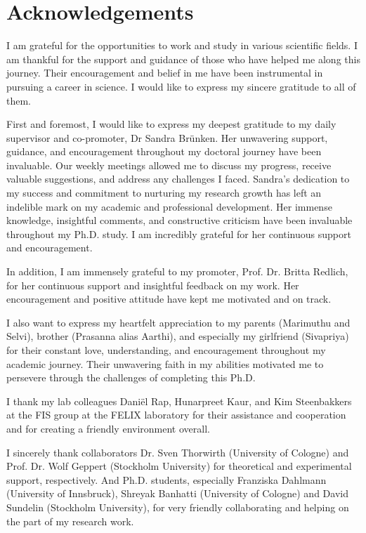 \chapter{Acknowledgements}
\label{acknowledgements}

I am grateful for the opportunities to work and study in various scientific fields. I am thankful for the support and guidance of those who have helped me along this journey. Their encouragement and belief in me have been instrumental in pursuing a career in science. I would like to express my sincere gratitude to all of them.

First and foremost, I would like to express my deepest gratitude to my daily supervisor and co-promoter, Dr Sandra Br\"{u}nken. Her unwavering support, guidance, and encouragement throughout my doctoral journey have been invaluable. Our weekly meetings allowed me to discuss my progress, receive valuable suggestions, and address any challenges I faced. Sandra's dedication to my success and commitment to nurturing my research growth has left an indelible mark on my academic and professional development. Her immense knowledge, insightful comments, and constructive criticism have been invaluable throughout my Ph.D. study. I am incredibly grateful for her continuous support and encouragement.

In addition, I am immensely grateful to my promoter, Prof. Dr. Britta Redlich, for her continuous support and insightful feedback on my work. Her encouragement and positive attitude have kept me motivated and on track.

I also want to express my heartfelt appreciation to my parents (Marimuthu and Selvi), brother (Prasanna alias Aarthi), and especially my girlfriend (Sivapriya) for their constant love, understanding, and encouragement throughout my academic journey. Their unwavering faith in my abilities motivated me to persevere through the challenges of completing this Ph.D.

I thank my lab colleagues Dani\"{e}l Rap, Hunarpreet Kaur, and Kim Steenbakkers at the FIS group at the FELIX laboratory for their assistance and cooperation and for creating a friendly environment overall.

I sincerely thank collaborators Dr. Sven Thorwirth (University of Cologne) and Prof. Dr. Wolf Geppert (Stockholm University) for theoretical and experimental support, respectively. And Ph.D. students, especially Franziska Dahlmann (University of Innsbruck), Shreyak Banhatti (University of Cologne) and David Sundelin (Stockholm University), for very friendly collaborating and helping on the part of my research work.

